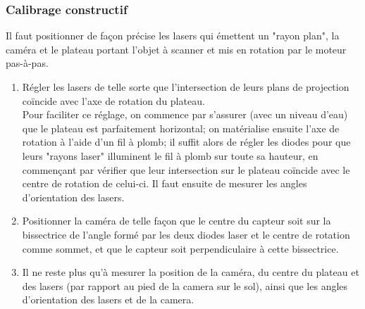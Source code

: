 \documentclass[a4paper,10pt]{report}
\begin{document}
\subsubsection{Calibrage constructif}
Il faut positionner de façon précise les lasers qui émettent un "rayon plan", la caméra et le plateau portant l'objet à scanner et mis en rotation par le moteur pas-à-pas.
\begin{enumerate}
\item Régler les lasers de telle sorte que l'intersection de leurs plans de projection coïncide avec l'axe de rotation du plateau.\\
Pour faciliter ce réglage, on commence par s'assurer (avec un niveau d'eau) que le plateau est parfaitement horizontal; on matérialise ensuite l'axe de rotation à l'aide d'un fil à plomb; il suffit alors de régler les diodes pour que leurs "rayons laser" illuminent le fil à plomb sur toute sa hauteur, en commençant par vérifier que leur intersection sur le plateau coïncide avec le centre de rotation de celui-ci. Il faut ensuite de mesurer les angles d'orientation des lasers.
\item Positionner la caméra de telle façon que le centre du capteur soit sur la bissectrice de l'angle formé par les deux diodes laser et le centre de rotation comme sommet, et que le capteur soit perpendiculaire à cette bissectrice.
\item Il ne reste plus qu'à mesurer la position de la caméra, du centre du plateau et des lasers (par rapport au pied de la camera sur le sol), ainsi que les angles d'orientation des lasers et de la camera.
\end{enumerate}
\end{document}
